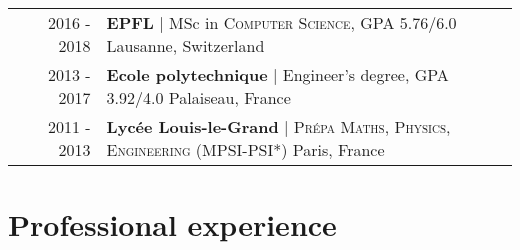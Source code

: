 \documentclass[a4paper,10pt]{article} %
\begin{document}
\begin{tabularx}{\textwidth}{p{0.19cm}rX}

& 2016 - \textsc{2018} & \textbf{\large EPFL} \hspace{0.2cm} | \hspace{0.01cm} MSc in \textsc{Computer Science}, GPA 5.76/6.0 \hfill Lausanne, Switzerland\vspace{0.2cm} \\

& 2013 - \textsc{2017} & \textbf{\large Ecole polytechnique} \hspace{0.2cm} | \hspace{0.01cm} Engineer's degree, GPA 3.92/4.0 \hfill Palaiseau, France\vspace{0.2cm} \\

& 2011 - 2013 & \textbf{\large Lyc\'ee Louis-le-Grand} \hspace{0.2cm} | \hspace{0.01cm} \textsc{Pr\'epa Maths, Physics, Engineering} (MPSI-PSI*) \hfill Paris, France\vspace{0.2cm} \\


\end{tabularx}



\section{Professional experience}
\end{document}
